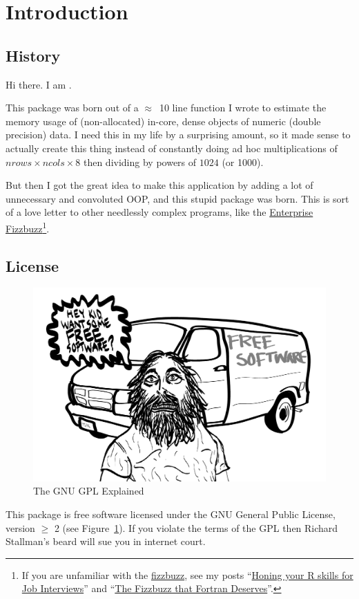 \section{Introduction}

\subsection{History}

Hi there.  I am .

This package was born out of a $\approx$~10 line function I wrote to estimate the memory usage of (non-allocated) in-core, dense  objects of numeric (double precision) data.  I need this in my life by a surprising amount, so it made sense to actually create this thing instead of constantly doing ad hoc multiplications of $nrows\times ncols \times 8$ then dividing by powers of $1024$ (or 1000).

But then I got the great idea to make this application  by adding a lot of unnecessary and convoluted OOP, and this stupid package was born.  This is sort of a love letter to other needlessly complex programs, like the \href{https://github.com/Mikkeren/FizzBuzzEnterpriseEdition}{Enterprise Fizzbuzz}\footnote{If you are unfamiliar with the \href{https://en.wikipedia.org/wiki/Bizz_buzz}{fizzbuzz}, see my posts ``\href{http://librestats.com/2012/01/10/honing-your-r-skills-for-job-interviews/}{Honing your R skills for Job Interviews}'' and ``\href{http://librestats.com/2013/04/26/the-fizzbuzz-that-fortran-deserves/}{The Fizzbuzz that Fortran Deserves}''.}.



\subsection{License}

\begin{figure}[th]
  \centering
  \includegraphics[scale=.35]{./include/gpl.png}
  \caption{The GNU GPL Explained}
  \label{fig:gnu}
\end{figure}
This package is free software licensed under the GNU General Public License, version $\geq$ 2 (see Figure~\ref{fig:gnu}).
If you violate the terms of the GPL then Richard Stallman's beard will sue you in internet court.



